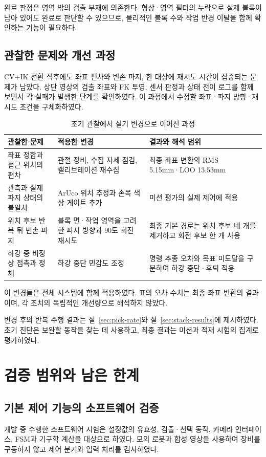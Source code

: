 완료 판정은 영역 밖의 검출 부재에 의존한다. 형상·영역 필터의 누락으로 실제 블록이 남아 있어도 완료로 판단할 수 있으므로, 물리적인 블록 수와 작업 반경 이탈을 함께 확인하는 기능이 필요하다.

\subsection{관찰한 문제와 개선 과정}
\label{sec:accuracy-fixes}
CV+IK 전환 직후에도 좌표 편차와 빈손 파지, 한 대상에 재시도 시간이 집중되는 문제가 남았다. 상단 영상의 검출 좌표와 FK 투영, 센서 판정과 상태 전이 로그를 함께 보면서 각 실패가 발생한 단계를 확인하였다. 이 과정에서 수정할 좌표·파지 방향·재시도 조건을 구체화하였다.

\begin{table}[htbp]
\centering
\caption{초기 관찰에서 실기 변경으로 이어진 과정}
\begin{tabularx}{\linewidth}{@{}YYY@{}}
\toprule 관찰한 문제 & 적용한 변경 & 결과와 해석 범위 \\
\midrule
좌표 정합과 접근 위치의 편차 & 관절 정비, 수집 자세 점검, 캘리브레이션 재수집 & 최종 좌표 변환의 RMS 5.15mm·LOO 13.53mm \\
관측과 실제 파지 상태의 불일치 & ArUco 위치 추정과 손목 색상 게이트 추가 & 미션 평가의 실제 제어에 적용 \\
위치 후보 반복 뒤 빈손 파지 & 블록 면·작업 영역을 고려한 파지 방향과 90도 회전 재시도 & 최종 기본 경로는 위치 후보 네 개를 제거하고 회전 후보 한 개 사용 \\
하강 중 비정상 접촉과 정체 & 하강 중단 민감도 조정 & 명령 추종 오차와 목표 미도달을 구분하여 하강 중단·후퇴 적용 \\
\bottomrule
\end{tabularx}
\end{table}

이 변경들은 전체 시스템에 함께 적용하였다. 표의 오차 수치는 최종 좌표 변환의 결과이며, 각 조치의 독립적인 개선량으로 해석하지 않았다.

변경 후의 반복 수행 결과는 절~\ref{sec:pick-rate}와 절~\ref{sec:stack-results}에 제시하였다. 초기 진단은 보완할 동작을 찾는 데 사용하고, 최종 결과는 미션과 적재 시험의 집계로 평가하였다.

\section{검증 범위와 남은 한계}
\subsection{기본 제어 기능의 소프트웨어 검증}
개발 중 수행한 소프트웨어 시험은 설정값의 유효성, 검출·선택 동작, 카메라 인터페이스, FSM과 기구학 계산을 대상으로 하였다. 모의 로봇과 합성 영상을 사용하여 장비를 구동하지 않고 제어 분기와 입력 처리를 검사하였다.

